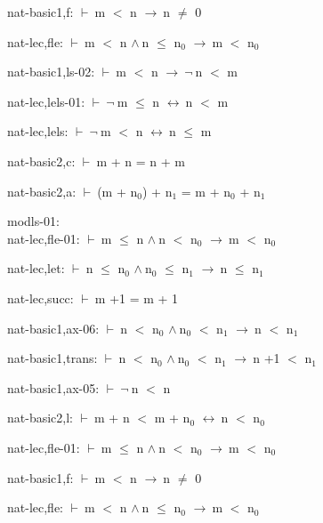 \documentclass[a4paper]{article}
\newcommand{\Fol}{\mbox{$\vdash\ $}}
\newcommand{\Not}{\mbox{$\neg\ $}}
\newcommand{\And}{\mbox{$\wedge\ $}}
\newcommand{\Imp}{\mbox{$\rightarrow\ $}}
\newcommand{\Equiv}{\mbox{$\leftrightarrow\ $}}
\begin{document}
nat-basic1,f: 
 \Fol m $<$ n \Imp n $\neq$ 0



nat-lec,fle: 
 \Fol m $<$ n \And n $\le$ $\mbox{n}_{0}$ \Imp m $<$ $\mbox{n}_{0}$



nat-basic1,ls-02: 
 \Fol m $<$ n \Imp \Not n $<$ m



nat-lec,lels-01: 
 \Fol \Not m $\le$ n \Equiv n $<$ m



nat-lec,lels: 
 \Fol \Not m $<$ n \Equiv n $\le$ m



nat-basic2,c: 
 \Fol m + n = n + m



nat-basic2,a: 
 \Fol (m + $\mbox{n}_{0}$) + $\mbox{n}_{1}$ = m + $\mbox{n}_{0}$ + $\mbox{n}_{1}$



\bigskip

modls-01:\\ nat-lec,fle-01: 
 \Fol m $\le$ n \And n $<$ $\mbox{n}_{0}$ \Imp m $<$ $\mbox{n}_{0}$

nat-lec,let: 
 \Fol n $\le$ $\mbox{n}_{0}$ \And $\mbox{n}_{0}$ $\le$ $\mbox{n}_{1}$ \Imp n $\le$ $\mbox{n}_{1}$



nat-lec,succ: 
 \Fol m +1 = m + 1



nat-basic1,ax-06: 
 \Fol n $<$ $\mbox{n}_{0}$ \And $\mbox{n}_{0}$ $<$ $\mbox{n}_{1}$ \Imp n $<$ $\mbox{n}_{1}$



nat-basic1,trans: 
 \Fol n $<$ $\mbox{n}_{0}$ \And $\mbox{n}_{0}$ $<$ $\mbox{n}_{1}$ \Imp n +1 $<$ $\mbox{n}_{1}$



nat-basic1,ax-05: 
 \Fol \Not n $<$ n



nat-basic2,l: 
 \Fol m + n $<$ m + $\mbox{n}_{0}$ \Equiv n $<$ $\mbox{n}_{0}$



nat-lec,fle-01: 
 \Fol m $\le$ n \And n $<$ $\mbox{n}_{0}$ \Imp m $<$ $\mbox{n}_{0}$



nat-basic1,f: 
 \Fol m $<$ n \Imp n $\neq$ 0



nat-lec,fle: 
 \Fol m $<$ n \And n $\le$ $\mbox{n}_{0}$ \Imp m $<$ $\mbox{n}_{0}$
\end{document}
